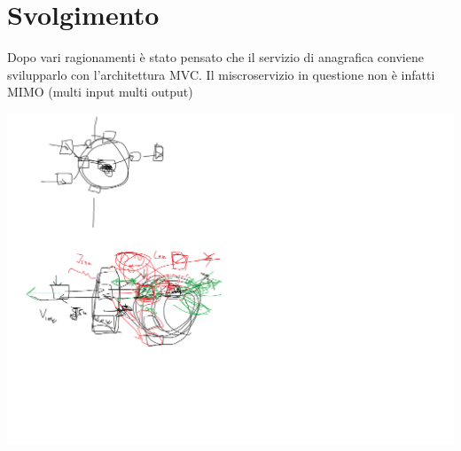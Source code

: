 \section{Svolgimento}

Dopo vari ragionamenti è stato pensato che il servizio di anagrafica conviene svilupparlo con l'architettura MVC.
Il miscroservizio in questione non è infatti MIMO (multi input multi output)



\includegraphics[width = 0.9\linewidth]{img/architettura.png}